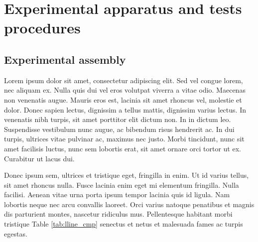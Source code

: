 
\ifpdf
\graphicspath{{Chapter3/figs/Raster/}{Chapter3/figs/PDF/}{Chapter3/figs/}}
\else
\graphicspath{{Chapter3/figs/Vector/}{Chapter3/figs/}}
\fi

\newcommand{\tabpath}[1]{./Chapter3/tables/#1}
\newcommand{\tikzpath}[1]{./Chapter3/figs/#1}
\newcolumntype{b}{X}



\chapter{Experimental apparatus and tests procedures}\label{ertp}  

\section[Experimental assembly]{Experimental assembly}\label{ertp:expt}

  Lorem ipsum dolor sit amet, consectetur adipiscing elit. Sed vel congue lorem, nec aliquam ex. Nulla quis dui vel eros volutpat viverra a vitae odio. Maecenas non venenatis augue. Mauris eros est, lacinia sit amet rhoncus vel, molestie et dolor. Donec sapien lectus, dignissim a tellus mattis, dignissim varius lectus. In venenatis nibh turpis, sit amet porttitor elit dictum non. In in dictum leo. Suspendisse vestibulum nunc augue, ac bibendum risus hendrerit ac. In dui turpis, ultrices vitae pulvinar ac, maximus nec justo. Morbi tincidunt, nunc sit amet facilisis luctus, nunc sem lobortis erat, sit amet ornare orci tortor ut ex. Curabitur ut lacus dui.

  Donec ipsum sem, ultrices et tristique eget, fringilla in enim. Ut id varius tellus, sit amet rhoncus nulla. Fusce lacinia enim eget mi elementum fringilla. Nulla facilisi. Aenean vitae urna porta ipsum tempor lacinia quis id ligula. Nam lobortis neque nec arcu convallis laoreet. Orci varius natoque penatibus et magnis dis parturient montes, nascetur ridiculus mus. Pellentesque habitant morbi tristique Table \ref{tab:lline_cmp} senectus et netus et malesuada fames ac turpis egestas. 

